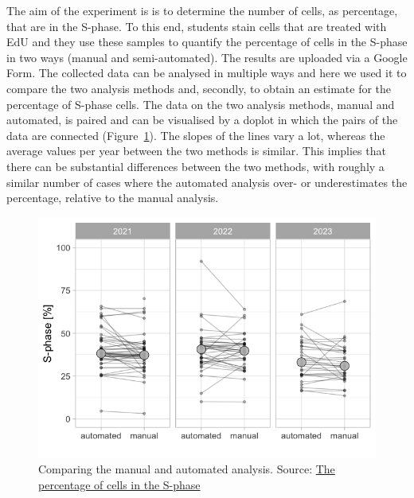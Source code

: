 \documentclass[
]{agujournal2019}
\begin{document}
The aim of the experiment is is to determine the number of cells, as
percentage, that are in the S-phase. To this end, students stain cells
that are treated with EdU and they use these samples to quantify the
percentage of cells in the S-phase in two ways (manual and
semi-automated). The results are uploaded via a Google Form. The
collected data can be analysed in multiple ways and here we used it to
compare the two analysis methods and, secondly, to obtain an estimate
for the percentage of S-phase cells. The data on the two analysis
methods, manual and automated, is paired and can be visualised by a
doplot in which the pairs of the data are connected
(Figure~\ref{fig-paired-data}). The slopes of the lines vary a lot,
whereas the average values per year between the two methods is similar.
This implies that there can be substantial differences between the two
methods, with roughly a similar number of cases where the automated
analysis over- or underestimates the percentage, relative to the manual
analysis.

\begin{figure}[H]

{\centering \includegraphics{index_files/figure-latex/fig-paired-data-output-1.png}

}

\caption{\label{fig-paired-data}Comparing the manual and automated
analysis. Source:
\href{https://JoachimGoedhart.github.io/MS-StudentSourcing/notebooks/PreciSe-preview.html\#cell-fig-paired-data}{The
percentage of cells in the S-phase}}

\end{figure}
\end{document}
